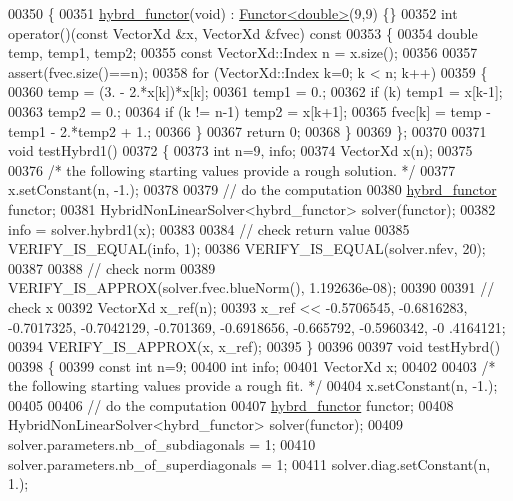 \begin{DoxyCode}
00350 \{
00351     \hyperlink{structhybrd__functor}{hybrd\_functor}(\textcolor{keywordtype}{void}) : \hyperlink{struct_functor}{Functor<double>}(9,9) \{\}
00352     \textcolor{keywordtype}{int} operator()(\textcolor{keyword}{const} VectorXd &x, VectorXd &fvec)\textcolor{keyword}{ const}
00353 \textcolor{keyword}{    }\{
00354         \textcolor{keywordtype}{double} temp, temp1, temp2;
00355         \textcolor{keyword}{const} VectorXd::Index n = x.size();
00356 
00357         assert(fvec.size()==n);
00358         \textcolor{keywordflow}{for} (VectorXd::Index k=0; k < n; k++)
00359         \{
00360             temp = (3. - 2.*x[k])*x[k];
00361             temp1 = 0.;
00362             \textcolor{keywordflow}{if} (k) temp1 = x[k-1];
00363             temp2 = 0.;
00364             \textcolor{keywordflow}{if} (k != n-1) temp2 = x[k+1];
00365             fvec[k] = temp - temp1 - 2.*temp2 + 1.;
00366         \}
00367         \textcolor{keywordflow}{return} 0;
00368     \}
00369 \};
00370 
00371 \textcolor{keywordtype}{void} testHybrd1()
00372 \{
00373   \textcolor{keywordtype}{int} n=9, info;
00374   VectorXd x(n);
00375 
00376   \textcolor{comment}{/* the following starting values provide a rough solution. */}
00377   x.setConstant(n, -1.);
00378 
00379   \textcolor{comment}{// do the computation}
00380   \hyperlink{structhybrd__functor}{hybrd\_functor} functor;
00381   HybridNonLinearSolver<hybrd\_functor> solver(functor);
00382   info = solver.hybrd1(x);
00383 
00384   \textcolor{comment}{// check return value}
00385   VERIFY\_IS\_EQUAL(info, 1);
00386   VERIFY\_IS\_EQUAL(solver.nfev, 20);
00387 
00388   \textcolor{comment}{// check norm}
00389   VERIFY\_IS\_APPROX(solver.fvec.blueNorm(), 1.192636e-08);
00390 
00391   \textcolor{comment}{// check x}
00392   VectorXd x\_ref(n);
00393   x\_ref << -0.5706545, -0.6816283, -0.7017325, -0.7042129, -0.701369, -0.6918656, -0.665792, -0.5960342, -0
      .4164121;
00394   VERIFY\_IS\_APPROX(x, x\_ref);
00395 \}
00396 
00397 \textcolor{keywordtype}{void} testHybrd()
00398 \{
00399   \textcolor{keyword}{const} \textcolor{keywordtype}{int} n=9;
00400   \textcolor{keywordtype}{int} info;
00401   VectorXd x;
00402 
00403   \textcolor{comment}{/* the following starting values provide a rough fit. */}
00404   x.setConstant(n, -1.);
00405 
00406   \textcolor{comment}{// do the computation}
00407   \hyperlink{structhybrd__functor}{hybrd\_functor} functor;
00408   HybridNonLinearSolver<hybrd\_functor> solver(functor);
00409   solver.parameters.nb\_of\_subdiagonals = 1;
00410   solver.parameters.nb\_of\_superdiagonals = 1;
00411   solver.diag.setConstant(n, 1.);

\end{DoxyCode}
